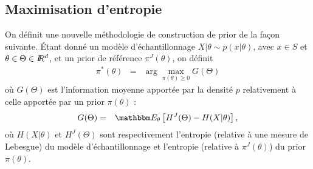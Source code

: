 \subsection{Maximisation d'entropie }\label{max.entropie}

On définit une nouvelle méthodologie de construction de prior de la fa\c con suivante. \'Etant donné un modèle d'échantillonnage $X|\theta \sim p(x|\theta)$, avec $x\in S$ et $\theta\in\Theta\in I\!\!R^d$, et un prior de référence $\pi^J(\theta)$, on définit
\begin{eqnarray}
\pi^*(\theta) & = & \arg\max\limits_{\pi(\theta)\geq 0} G(\Theta) \label{mdiprior}
\end{eqnarray}
où $G(\Theta)$ est l'information moyenne apportée par la densité $p$ relativement à celle apportée par un prior $\pi(\theta)$ :
\begin{eqnarray*}
G(\Theta) & = & \E_{\theta}\left[H^J(\Theta) - H(X|\theta)\right],
\end{eqnarray*}
où $H(X|\theta)$ et
$H^J(\Theta)$ sont respectivement l'entropie (relative à une mesure de Lebesgue) du modèle d'échantillonnage et l'entropie (relative à $\pi^J(\theta)$) du prior $\pi(\theta)$. 
